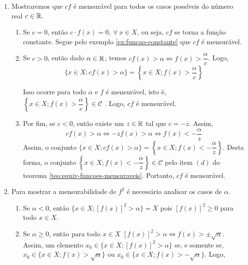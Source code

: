 \begin{prova}
    \begin{enumerate}[label*=(\alph*)]
        \item Mostraremos que $cf$ é mensurável para todos os casos possíveis do número real $c \in \mathbb{R}$.
            \begin{enumerate}[label=(\roman*)]
                \item Se $c = 0$, então $c\cdot f(x) = 0, \ \forall \ x \in X$, ou seja, $cf$ se torna a função constante. Segue pelo exemplo \ref{ex:funcao-constante} que $cf$ é mensurável.
                \item Se $c>0$, então  dado $\alpha \in \mathbb{R}$, temos $cf(x) > \alpha \Leftrightarrow f(x) >\dfrac{\alpha}{c}$. 
                Logo, 
                $$
                \{x \in X; cf(x) > \alpha\} 
                = 
                \left\{x \in X; f(x) > \dfrac{\alpha}{c}\right\}
                $$
                    
                Isso ocorre para todo $\alpha$ e $f$ é mensurável, isto é, $\left\{x \in X; f(x) > \dfrac{\alpha}{c}\right\} \in \mathcal{C}$  . Logo, $cf$ é mensurável.
                \item Por fim, se $c < 0$, então existe um $z \in \mathbb{R}$ tal que $c = -z$.
                Assim, 
                $$cf(x) >\alpha \Leftrightarrow -zf(x) >\alpha \Leftrightarrow f(x) < -\dfrac{\alpha}{z}$$
                Assim, o conjunto $\{x \in X; cf(x) > \alpha \} = \left\{x \in X; f(x) < -\dfrac{\alpha}{z}\right\}$.
                Desta forma, o conjunto  $\left\{x \in X; f(x) < -\dfrac{\alpha}{z}\right\}  \in \mathcal{C}$ pelo  item $(d)$ do teorema \ref{teo:equiv-funcoes-mensuraveis}. Portanto,  $cf$ é mensurável.
            \end{enumerate}
            
        \item Para mostrar a mensurabilidade de $f^2$ é necessário analisar os casos de $\alpha$.
            \begin{enumerate}[label = (\roman*)]
                \item Se $\alpha < 0$, então $\{x \in X; [f(x)]^2 > \alpha\} = X$ pois $[f(x)]^2 \geq 0$ para todo $x \in X$.
                
                \item Se $\alpha \geq 0$, então para todo $x \in X$ $[f(x)]^2 > \alpha \Leftrightarrow f(x) > \pm \sqrt{\alpha}$.
                Assim, um elemento 
                $x_0 \in \{x \in X; [f(x)]^2 > \alpha\}$ se, e somente se, $x_0 \in \{x \in X; f(x)> \sqrt{\alpha}\}$ ou \linebreak $x_0 \in \{x \in X; f(x)> -\sqrt{\alpha}\}$.
                Logo, 
                

\end{enumerate}
\end{enumerate}
\end{prova}
